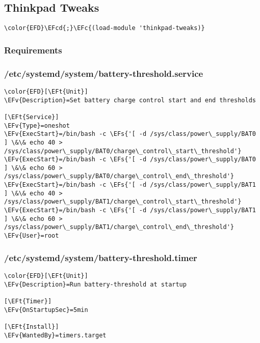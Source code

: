 \documentclass[a4wide,10pt]{article}
\newcommand{\EFc}[1]{\textcolor{EFc}{#1}} %
\newcommand{\EFcd}[1]{\textcolor{EFcd}{#1}} %
\newcommand{\EFs}[1]{\textcolor{EFs}{#1}} %
\newcommand{\EFv}[1]{\textcolor{EFv}{#1}} %
\newcommand{\EFt}[1]{\textcolor{EFt}{#1}} %
\begin{document}
\subsection{Thinkpad Tweaks}
\label{sec:org6458aba}
\begin{Code}
\begin{Verbatim}
\color{EFD}\EFcd{;}\EFc{(load-module 'thinkpad-tweaks)}
\end{Verbatim}
\end{Code}
\subsubsection{Requirements}
\label{sec:org9191522}
\subsubsection{/etc/systemd/system/battery-threshold.service}
\label{sec:orge290ebb}
\begin{Code}
\begin{Verbatim}
\color{EFD}[\EFt{Unit}]
\EFv{Description}=Set battery charge control start and end thresholds

[\EFt{Service}]
\EFv{Type}=oneshot
\EFv{ExecStart}=/bin/bash -c \EFs{'[ -d /sys/class/power\_supply/BAT0 ] \&\& echo 40 > /sys/class/power\_supply/BAT0/charge\_control\_start\_threshold'}
\EFv{ExecStart}=/bin/bash -c \EFs{'[ -d /sys/class/power\_supply/BAT0 ] \&\& echo 60 > /sys/class/power\_supply/BAT0/charge\_control\_end\_threshold'}
\EFv{ExecStart}=/bin/bash -c \EFs{'[ -d /sys/class/power\_supply/BAT1 ] \&\& echo 40 > /sys/class/power\_supply/BAT1/charge\_control\_start\_threshold'}
\EFv{ExecStart}=/bin/bash -c \EFs{'[ -d /sys/class/power\_supply/BAT1 ] \&\& echo 60 > /sys/class/power\_supply/BAT1/charge\_control\_end\_threshold'}
\EFv{User}=root
\end{Verbatim}
\end{Code}
\subsubsection{/etc/systemd/system/battery-threshold.timer}
\label{sec:org4becde7}
\begin{Code}
\begin{Verbatim}
\color{EFD}[\EFt{Unit}]
\EFv{Description}=Run battery-threshold at startup

[\EFt{Timer}]
\EFv{OnStartupSec}=5min

[\EFt{Install}]
\EFv{WantedBy}=timers.target
\end{Verbatim}
\end{Code}
\end{document}
